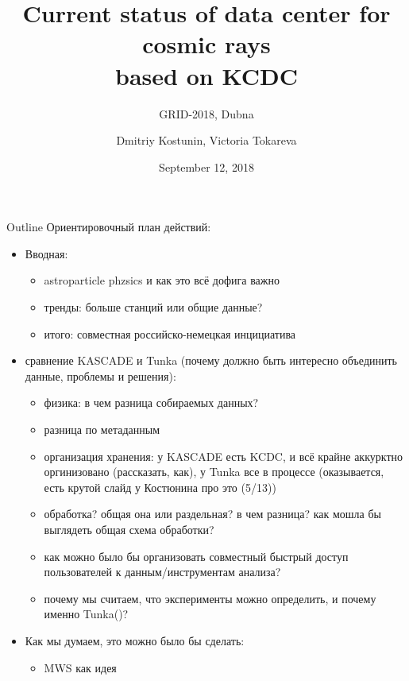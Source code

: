 \documentclass[18pt]{beamer}
\title[Cosmic rays data center]{Current status of data center for cosmic rays \\based on KCDC}
\subtitle{GRID-2018, Dubna}
\author{Dmitriy Kostunin, Victoria Tokareva}
\institute{Institute for Nuclear Physics (IKP)}
\date{September 12, 2018}
\begin{document}

\begin{frame}
\titlepage
\end{frame}

\begin{frame}[allowframebreaks]{Outline}
Ориентировочный план действий:
\begin{itemize}
 \item Вводная:
 \begin{itemize}
 \item astroparticle phzsics и как это всё дофига важно
 \item тренды: больше станций или общие данные?
 \item итого: совместная российско-немецкая инцициатива
 \end{itemize}
 \item сравнение KASCADE и Tunka (почему должно быть интересно объединить данные, проблемы и решения):
 \begin{itemize}
    \item физика: в чем разница собираемых данных?
    \item разница по метаданным
    \item организация хранения: у KASCADE есть KCDC, и всё крайне аккурктно оргинизовано (рассказать, как),
    у Tunka все в процессе (оказывается, есть крутой слайд у Костюнина про это (5/13))
    \item обработка? общая она или раздельная? в чем разница? как мошла бы выглядеть общая схема обработки?
    \item как можно было бы организовать совместный быстрый доступ пользователей к данным/инструментам анализа?
    \item почему мы считаем, что эксперименты можно определить, и почему именно Tunka()?
 \end{itemize}
 \item Как мы думаем, это можно было бы сделать:
    \begin{itemize}
        \item MWS как идея

\end{itemize}
\end{itemize}
\end{frame}
\end{document}
